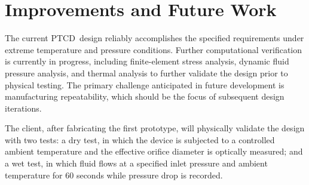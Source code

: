 \documentclass[12pt, letterpaper]{report}%
\newcounter{mycounter}           %
\newcounter{sub}[mycounter]      %
\newcommand{\device}{PTCD}
\begin{document}
\section*{Improvements and Future Work}

    The current \device\ design reliably accomplishes the specified requirements under extreme temperature and pressure conditions. Further computational verification is currently in progress, including finite-element stress analysis, dynamic fluid pressure analysis, and thermal analysis to further validate the design prior to physical testing. The primary challenge anticipated in future development is manufacturing repeatability, which should be the focus of subsequent design iterations.

    The client, after fabricating the first prototype, will physically validate the design with two tests: a dry test, in which the device is subjected to a controlled ambient temperature and the effective orifice diameter is optically measured; and a wet test, in which fluid flows at a specified inlet pressure and ambient temperature for 60 seconds while pressure drop is recorded.
\end{document}
